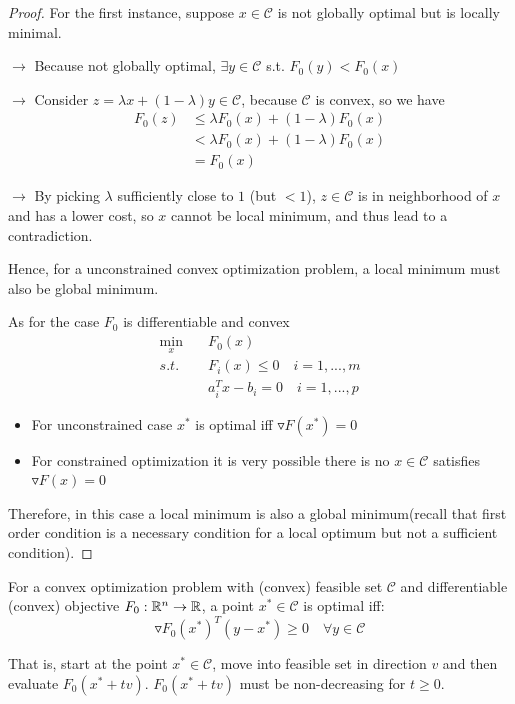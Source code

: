 \begin{proof}
    
    For the first instance, suppose $x\in \mathcal{C}$ is not globally optimal but is locally minimal.
	
	$\rightarrow$ Because not globally optimal, $\exists y\in \mathcal{C}$ s.t. $F_0(y)<F_0(x)$
	
	$\rightarrow$ Consider $z = \lambda x + (1-\lambda)y\in \mathcal{C}$, because $\mathcal{C}$ is convex, so we have
	\begin{align*}
	F_0(z) &\leq \lambda F_0(x) + (1-\lambda)F_0(x)\\
	&< \lambda F_0(x) + (1-\lambda)F_0(x)\\
	&= F_0(x)
	\end{align*}
	
	$\rightarrow$ By picking $\lambda$ sufficiently close to $1$ (but $< 1$), $z\in \mathcal{C}$ is in neighborhood of $x$ and has a lower cost, so $x$ cannot be local minimum, and thus lead to a contradiction.
	
	Hence, for a unconstrained convex optimization problem, a local minimum must also be global minimum.
	
	As for the case $F_0$ is differentiable and convex
	\begin{align*}
	\min_x\quad & F_0(x) \\
	s.t.\quad & F_i(x) \leq 0 \quad i = 1,...,m\\
	& a_i^Tx - b_i = 0\quad i = 1,...,p
	\end{align*}

	\begin{itemize}
	\item For unconstrained case $x^*$ is optimal iff $\triangledown F(x^*) = 0$
	
	\item For constrained optimization it is very possible there is no $x\in \mathcal{C}$ satisfies $\triangledown F(x) = 0$
	\end{itemize}

	Therefore, in this case a local minimum is also a global minimum(recall that first order condition is a necessary condition for a local optimum but not a sufficient condition).
	\end{proof}



\begin{theorem}
	For a convex optimization problem with (convex) feasible set $\mathcal{C}$ and differentiable (convex) objective $F_0: \mathbb{R}^n \rightarrow \mathbb{R}$, a point $x^* \in \mathcal{C}$ is optimal iff:
	\begin{equation*}
	\triangledown F_0(x^*)^T(y - x^*) \geq 0  \quad \forall y \in \mathcal{C}
	\end{equation*}

That is, start at the point $x^*\in \mathcal{C}$, move into feasible set in direction $v$ and then evaluate $F_0(x^*+tv)$. $F_0(x^*+tv)$ must be non-decreasing for $t\geq 0$.
\end{theorem}

